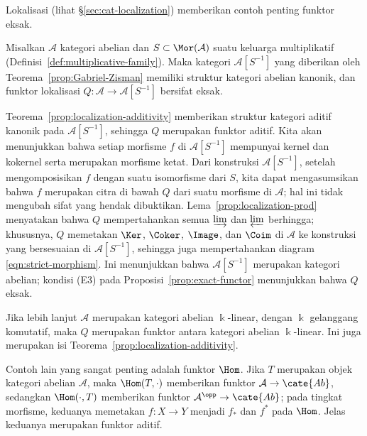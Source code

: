 Lokalisasi (lihat \S\ref{sec:cat-localization}) memberikan contoh penting
funktor eksak.

\begin{proposisi}\label{prop:Abel-cat-localization}
Misalkan $\mathcal{A}$ kategori abelian dan $S\subset\Mor(\mathcal{A})$ suatu
keluarga multiplikatif (Definisi~\ref{def:multiplicative-family}). Maka kategori
$\mathcal{A}[S^{-1}]$ yang diberikan oleh Teorema~\ref{prop:Gabriel-Zisman}
memiliki struktur kategori abelian kanonik, dan funktor lokalisasi
$Q:\mathcal{A}\to\mathcal{A}[S^{-1}]$ bersifat eksak.
\end{proposisi}

\begin{bukti}
Teorema~\ref{prop:localization-additivity} memberikan struktur kategori aditif
kanonik pada $\mathcal{A}[S^{-1}]$, sehingga $Q$ merupakan funktor aditif. Kita
akan menunjukkan bahwa setiap morfisme $f$ di $\mathcal{A}[S^{-1}]$ mempunyai
kernel dan kokernel serta merupakan morfisme ketat. Dari konstruksi
$\mathcal{A}[S^{-1}]$, setelah mengomposisikan $f$ dengan suatu isomorfisme dari
$S$, kita dapat mengasumsikan bahwa $f$ merupakan citra di bawah $Q$ dari suatu
morfisme di $\mathcal{A}$; hal ini tidak mengubah sifat yang hendak dibuktikan.
Lema~\ref{prop:localization-prod} menyatakan bahwa $Q$ mempertahankan semua
$\varinjlim$ dan $\varprojlim$ berhingga; khususnya, $Q$ memetakan
$\Ker$, $\Coker$, $\Image$, dan $\Coim$ di $\mathcal{A}$ ke konstruksi yang
bersesuaian di $\mathcal{A}[S^{-1}]$, sehingga juga mempertahankan diagram
\eqref{eqn:strict-morphism}. Ini menunjukkan bahwa $\mathcal{A}[S^{-1}]$
merupakan kategori abelian; kondisi (E3) pada Proposisi~\ref{prop:exact-functor}
menunjukkan bahwa $Q$ eksak.
\end{bukti}

Jika lebih lanjut $\mathcal{A}$ merupakan kategori abelian $\Bbbk$-linear,
dengan $\Bbbk$ gelanggang komutatif, maka $Q$ merupakan funktor antara kategori
abelian $\Bbbk$-linear. Ini juga merupakan isi Teorema~\ref{prop:localization-additivity}.

Contoh lain yang sangat penting adalah funktor $\Hom$. Jika $T$ merupakan objek
kategori abelian $\mathcal{A}$, maka $\Hom(T,\cdot)$ memberikan funktor
$\mathcal{A}\to\cate{Ab}$, sedangkan $\Hom(\cdot,T)$ memberikan funktor
$\mathcal{A}^{\opp}\to\cate{Ab}$; pada tingkat morfisme, keduanya memetakan
$f:X\to Y$ menjadi $f_*$ dan $f^*$ pada $\Hom$. Jelas keduanya merupakan funktor
aditif.

